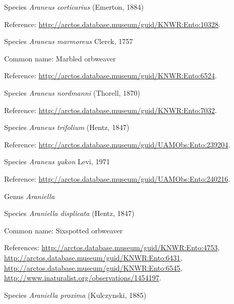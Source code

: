 \documentclass[9pt, article]{memoir}
\begin{document}
\begin{multicols}{2}
\vspace{6pt}\noindent\hspace{36pt}Species \textit{Araneus corticarius} (Emerton, 1884)


Reference: 
\url{http://arctos.database.museum/guid/KNWR:Ento:10328}.

\vspace{6pt}\noindent\hspace{36pt}Species \textit{Araneus marmoreus} Clerck, 1757


Common name: Marbled orbweaver

Reference: 
\url{http://arctos.database.museum/guid/KNWR:Ento:6524}.

\vspace{6pt}\noindent\hspace{36pt}Species \textit{Araneus nordmanni} (Thorell, 1870)


Reference: 
\url{http://arctos.database.museum/guid/KNWR:Ento:7032}.

\vspace{6pt}\noindent\hspace{36pt}Species \textit{Araneus trifolium} (Hentz, 1847)


Reference: 
\url{http://arctos.database.museum/guid/UAMObs:Ento:239204}.

\vspace{6pt}\noindent\hspace{36pt}Species \textit{Araneus yukon} Levi, 1971


Reference: 
\url{http://arctos.database.museum/guid/UAMObs:Ento:240216}.

\vspace{6pt}\noindent\hspace{30pt}Genus \textit{Araniella}


\vspace{6pt}\noindent\hspace{36pt}Species \textit{Araniella displicata} (Hentz, 1847)


Common name: Sixspotted orbweaver

References: 
\url{http://arctos.database.museum/guid/KNWR:Ento:4753}, 
\url{http://arctos.database.museum/guid/KNWR:Ento:6431}, 
\url{http://arctos.database.museum/guid/KNWR:Ento:6545}, 
\url{http://www.inaturalist.org/observations/1454197}.

\vspace{6pt}\noindent\hspace{36pt}Species \textit{Araniella proxima} (Kulczynski, 1885)



\end{multicols}
\end{document}
